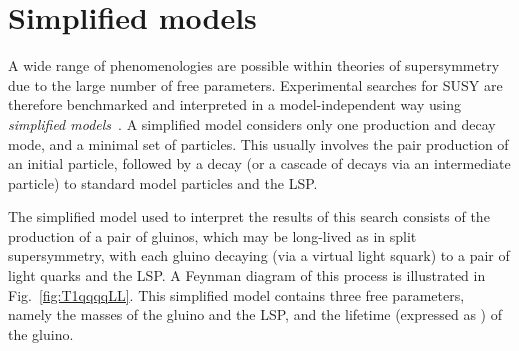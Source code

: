 
\section{Simplified models}
\label{sec:theory-simplifiedmodels}
A wide range of phenomenologies are possible within theories of supersymmetry 
due to the large number of free parameters. Experimental searches for SUSY are 
therefore benchmarked and interpreted in a model-independent way using 
\textit{simplified models}~\cite{simpmodels1,simpmodels2}.
A simplified model considers only one production and decay mode, and a minimal 
set of particles. This usually involves the pair production of an initial 
particle, followed by a decay (or a cascade of decays via an intermediate 
particle) to standard model particles and the LSP.

The simplified model used to interpret the results of this search consists of 
the production of a pair of gluinos, which may be long-lived as in split 
supersymmetry, with each gluino decaying (via a virtual light squark) to a pair 
of light quarks and the LSP. 
A Feynman diagram of this process is illustrated in Fig.~\ref{fig:T1qqqqLL}.
This simplified model contains three free parameters, namely the masses of the 
gluino and the LSP, and the lifetime (expressed as \ctau) of the gluino.

